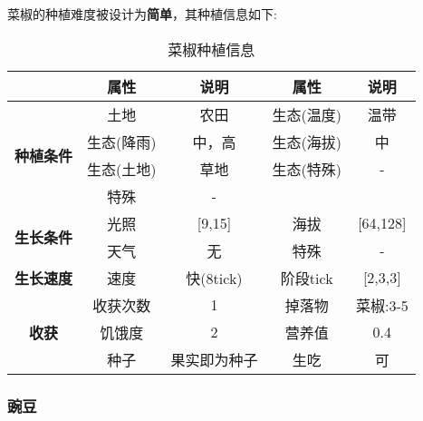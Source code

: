 菜椒的种植难度被设计为\textbf{简单}，其种植信息如下:

\begin{table}[H]
    \centering
    \caption{菜椒种植信息}
    \label{table:菜椒种植信息}
    \setlength{\tabcolsep}{4mm}
    \begin{tabular}{c|cc|cc}
        \toprule
                                           & \textbf{属性} & \textbf{说明} & \textbf{属性} & \textbf{说明} \\
        \midrule
        \multirow{4}{*}{\textbf{种植条件}} & 土地          & 农田          & 生态(温度)    & 温带    \\
                                           & 生态(降雨)    & 中，高        & 生态(海拔)    & 中            \\
                                           & 生态(土地)    & 草地          & 生态(特殊)    & -             \\
                                           & 特殊          & -                                             \\
        \midrule
        \multirow{2}{*}{\textbf{生长条件}} & 光照          & [9,15]        & 海拔          & [64,128]      \\
                                           & 天气          & 无            & 特殊          & -             \\
        \midrule
        \textbf{生长速度}                  & 速度          & 快(8tick)     & 阶段tick      & [2,3,3]       \\
        \midrule
        \multirow{3}{*}{\textbf{收获}}     & 收获次数      & 1             & 掉落物        & 菜椒:3-5      \\
                                           & 饥饿度        & 2             & 营养值        & 0.4           \\
                                           & 种子          & 果实即为种子  & 生吃          & 可   \\
        \bottomrule
    \end{tabular}
\end{table}

\subsubsection{豌豆}

